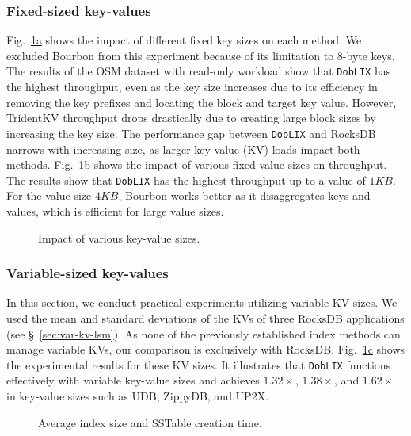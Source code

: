 \subsubsection{\textbf{Fixed-sized key-values}}
Fig.~\hyperref[fig:eval-kv-size]{\ref*{fig:eval-kv-size}a} shows the impact of different fixed key sizes on each method. We excluded Bourbon from this experiment because of its limitation to $8$-byte keys. The results of the OSM dataset with read-only workload show that \texttt{DobLIX} has the highest throughput, even as the key size increases due to its efficiency in removing the key prefixes and locating the block and target key value. However, TridentKV throughput drops drastically due to creating large block sizes by increasing the key size. The performance gap between \texttt{DobLIX} and RocksDB narrows with increasing size, as larger key-value (KV) loads impact both methods.
Fig.~\hyperref[fig:eval-kv-size]{\ref*{fig:eval-kv-size}b} shows the impact of various fixed value sizes on throughput. The results show that \texttt{DobLIX} has the highest throughput up to a value of $1KB$. For the value size $4KB$, Bourbon works better as it disaggregates keys and values, which is efficient for large value sizes.


\begin{figure}[t]
  \centering
  \vspace{-2em}
  \caption{\small{Impact of various key-value sizes.}}
  \label{fig:eval-kv-size}
  \vspace{-0.2em}
\end{figure}

\subsubsection{\textbf{Variable-sized key-values}}
In this section, we conduct practical experiments utilizing variable KV sizes. We used the mean and standard deviations of the KVs of three RocksDB applications (see \S~\ref{sec:var-kv-lsm}). As none of the previously established index methods can manage variable KVs, our comparison is exclusively with RocksDB. Fig.~\hyperref[fig:eval-kv-size]{\ref*{fig:eval-kv-size}c} shows the experimental results for these KV sizes. It illustrates that \texttt{DobLIX} functions effectively with variable key-value sizes and achieves $1.32\times$, $1.38\times$, and $1.62\times$ in key-value sizes such as UDB, ZippyDB, and UP2X.

\begin{figure}[t]
  \centering
  \vspace{-2em}
  \caption{\small{Average index size and SSTable creation time.}}
  \label{fig:eval-mem-construction}
  \vspace{-2em}
\end{figure}

